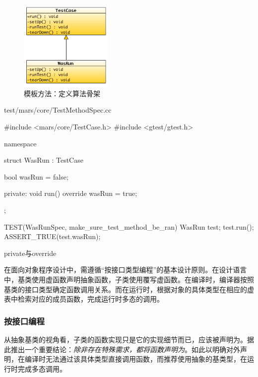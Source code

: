 \begin{content}
\begin{figure}[H]
\centering
\includegraphics[width=0.4\textwidth]{figures/xunit/simple-test.png}
\caption{模板方法：定义算法骨架}
 \label{fig:simple-test}
\end{figure}

\begin{nodiff}{test/mars/core/TestMethodSpec.cc}
 \begin{c++}
#include <mars/core/TestCase.h>
#include <gtest/gtest.h>

namespace {
  struct WasRun : TestCase {
    bool wasRun = false;

  private:
    void run() override {
      wasRun = true;
    }
  };
}

TEST(WasRunSpec, make_sure_test_method_be_ran) {
  WasRun test;
  test.run();
  ASSERT_TRUE(test.wasRun);
}
  \end{c++}
\end{nodiff}

\begin{episode}{private与override}
\begin{content}

在面向对象程序设计中，需遵循“按接口类型编程”的基本设计原则。在设计语言中，基类使用虚函数声明抽象函数，子类使用覆写虚函数。在编译时，编译器按照基类的接口类型确定函数调用关系。而在运行时，根据对象的具体类型在相应的虚表中检索对应的成员函数，完成运行时多态的调用。

\subsubsection{按接口编程}

从抽象基类的视角看，子类的函数实现只是它的实现细节而已，应该被声明为。据此推出一个重要结论：\emph{除非存在特殊需求，都将函数声明为}。如此以明确对外声明，在编译时无法通过该具体类型直接调用函数，而推荐使用抽象的基类型，在运行时完成多态调用。


\end{content}
\end{episode}
\end{content}
